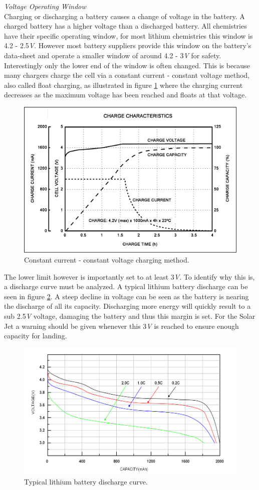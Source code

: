 \textit{Voltage Operating Window}\\
Charging or discharging a battery causes a change of voltage in the battery. A charged battery has a higher voltage than a discharged battery. All chemistries have their specific operating window, for most lithium chemistries this window is 4.2 - 2.5\textit{V}. However most battery suppliers provide this window on the battery's data-sheet and operate a smaller window of around 4.2 - 3\textit{V} for safety. Interestingly only the lower end of the window is often changed. This is because many chargers charge the cell via a constant current - constant voltage method, also called float charging, as illustrated in figure \ref{Fig:Charging} where the charging current decreases as the maximum voltage has been reached and floats at that voltage.
\begin{figure} [H]
	\centering
	\includegraphics[width=0.8\linewidth]{Figures/charging.png}
	\caption{Constant current - constant voltage charging method.}
   \label{Fig:Charging}
\end{figure}
The lower limit however is importantly set to at least 3\textit{V}. To identify why this is, a discharge curve must be analyzed. A typical lithium battery discharge can be seen in figure \ref{Fig:Discharge}. A steep decline in voltage can be seen as the battery is nearing the discharge of all its capacity. Discharging more energy will quickly result to a sub 2.5\textit{V} voltage, damaging the battery and thus this margin is set. For the Solar Jet a warning should be given whenever this 3\textit{V} is reached to ensure enough capacity for landing.
\begin{figure} [H]
	\centering
	\includegraphics[width=0.65\linewidth]{Figures/battery-discharge.png}
	\caption{Typical lithium battery discharge curve.}
   \label{Fig:Discharge}
\end{figure}
